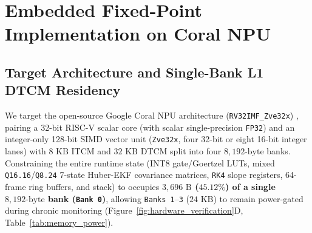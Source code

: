 \documentclass[11pt]{article}
\theoremstyle{plain}
\theoremstyle{remark}
\begin{document}
\section{Embedded Fixed-Point Implementation on Coral NPU}

\subsection{Target Architecture and Single-Bank L1 DTCM Residency}
We target the open-source Google Coral NPU architecture (\texttt{RV32IMF\_Zve32x}) \cite{coralnpu2025datasheet,waterman2014riscv}, pairing a 32-bit RISC-V scalar core (with scalar single-precision \texttt{FP32}) and an integer-only 128-bit SIMD vector unit (\texttt{Zve32x}, four 32-bit or eight 16-bit integer lanes) with $8\text{ KB}$ ITCM and $32\text{ KB}$ DTCM split into four $8{,}192\text{-byte}$ banks. Constraining the entire runtime state (INT8 gate/Goertzel LUTs, mixed \texttt{Q16.16}/\texttt{Q8.24} 7-state Huber-EKF covariance matrices, \texttt{RK4} slope registers, 64-frame ring buffers, and stack) to  occupies \textbf{$3{,}696\text{ B}$ ($45.12\%$) of a single $8{,}192\text{-byte}$ bank (\texttt{Bank~0})}, allowing \texttt{Banks~1}--\texttt{3} ($24\text{ KB}$) to remain power-gated during chronic monitoring (Figure~\ref{fig:hardware_verification}D, Table~\ref{tab:memory_power}).
\end{document}
